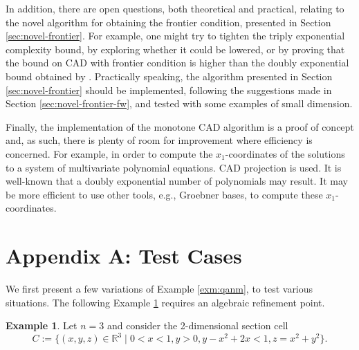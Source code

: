 \documentclass[
]{book}
\theoremstyle{definition}
\theoremstyle{definition}
\newtheorem{example}{Example}[chapter]
\theoremstyle{definition}
\theoremstyle{definition}
\theoremstyle{remark}
\begin{document}
In addition, there are open questions, both theoretical and practical, relating to the novel algorithm for obtaining the frontier condition, presented in Section \ref{sec:novel-frontier}. For example, one might try to tighten the triply exponential complexity bound, by exploring whether it could be lowered, or by proving that the bound on CAD with frontier condition is higher than the doubly exponential bound obtained by \citet{davenportHeintz1988}. Practically speaking, the algorithm presented in Section \ref{sec:novel-frontier} should be implemented, following the suggestions made in Section \ref{sec:novel-frontier-fw}, and tested with some examples of small dimension.

Finally, the implementation of the monotone CAD algorithm is a proof of concept and, as such, there is plenty of room for improvement where efficiency is concerned. For example, in order to compute the \(x_1\)-coordinates of the solutions to a system of multivariate polynomial equations. CAD projection is used. It is well-known that a doubly exponential number of polynomials may result. It may be more efficient to use other tools, e.g., Groebner bases, to compute these \(x_1\)-coordinates.

\hypertarget{appendix-a-test-cases}{%
\chapter*{Appendix A: Test Cases}\label{appendix-a-test-cases}}

We first present a few variations of Example \ref{exm:qanm}, to test various situations. The following Example \ref{exm:qanm-3-alg} requires an algebraic refinement point.

\begin{example}
\protect\hypertarget{exm:qanm-3-alg}{}\label{exm:qanm-3-alg}Let \(n = 3\) and consider the 2-dimensional section cell
\[
C := \{ (x,y,z) \in \mathbb{R}^3 \mid 0 < x < 1, y > 0, y - x^2 + 2x < 1, z = x^2 + y^2 \}.
\]
\end{example}
\end{document}
